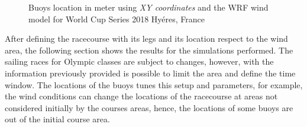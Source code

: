 \begin{figure} [hbt!]
  \centering
  \hfill
    \hfill
  \caption{Buoys location in meter using \textit{XY coordinates} and the WRF wind model for World Cup Series 2018 Hyéres, France} %
\label{fig:weather_bouys_detaila}
\end{figure}
After defining the racecourse with its legs and its location respect to the wind area, the following section shows the results for the simulations performed. The sailing races for Olympic classes are subject to changes, however, with the information previously provided is possible to limit the area and define the time window. The locations of the buoys tunes this setup and parameters, for example, the wind conditions can change the locations of the racecourse at areas not considered initially by the courses areas, hence, the locations of some buoys are out of the initial course area.
